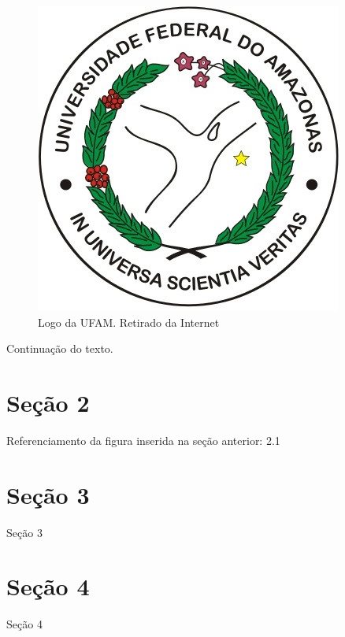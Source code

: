 \documentclass[
	12pt,				%
	openright,			%
	oneside,
	a4paper,				%
	english,				%
	brazil				%
]{abntex2/abntex2} %
\begin{document}
		\begin{figure}[h!]
			\begin{center}
			    \includegraphics[scale=0.5]{abntex2/ufam-logo}
			\end{center}
			\caption{\label{fig_grafico}Logo da UFAM. Retirado da Internet}
		\end{figure}

		Continuação do texto.

	\section{Seção 2}

		Referenciamento da figura inserida na seção anterior: 2.1

	\section{Seção 3}

		Seção 3

	\section{Seção 4}

		Seção 4




\end{document}
